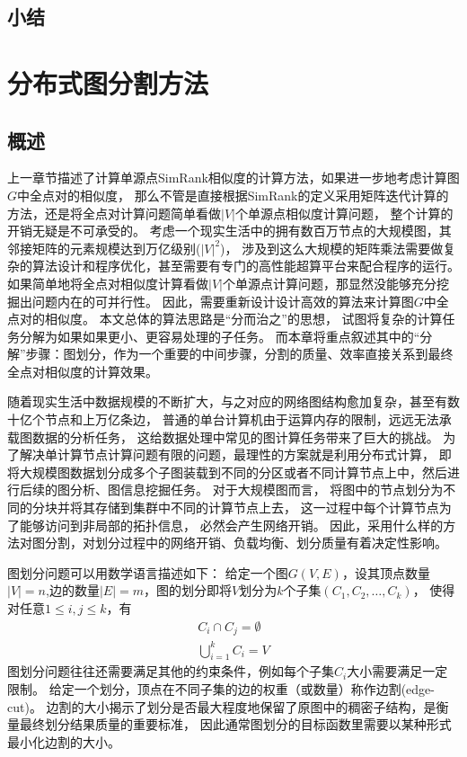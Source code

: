 \documentclass[master]{njuthesis}
\begin{document}
\section{小结}
\chapter{分布式图分割方法}\label{chapter_graphpartition}
\section{概述}
上一章节描述了计算单源点SimRank相似度的计算方法，如果进一步地考虑计算图$G$中全点对的相似度，
那么不管是直接根据SimRank的定义采用矩阵迭代计算的方法，还是将全点对计算问题简单看做$|V|$个单源点相似度计算问题，
整个计算的开销无疑是不可承受的。
考虑一个现实生活中的拥有数百万节点的大规模图，其邻接矩阵的元素规模达到万亿级别($|V|^2$)，
涉及到这么大规模的矩阵乘法需要做复杂的算法设计和程序优化，甚至需要有专门的高性能超算平台来配合程序的运行。
如果简单地将全点对相似度计算看做$|V|$个单源点计算问题，那显然没能够充分挖掘出问题内在的可并行性。
因此，需要重新设计设计高效的算法来计算图$G$中全点对的相似度。
本文总体的算法思路是“分而治之”的思想，
试图将复杂的计算任务分解为如果如果更小、更容易处理的子任务。
而本章将重点叙述其中的“分解”步骤：图划分，作为一个重要的中间步骤，分割的质量、效率直接关系到最终全点对相似度的计算效果。

随着现实生活中数据规模的不断扩大，与之对应的网络图结构愈加复杂，甚至有数十亿个节点和上万亿条边，
普通的单台计算机由于运算内存的限制，远远无法承载图数据的分析任务，
这给数据处理中常见的图计算任务带来了巨大的挑战。
为了解决单计算节点计算问题有限的问题，最理性的方案就是利用分布式计算，
即将大规模图数据划分成多个子图装载到不同的分区或者不同计算节点上中，然后进行后续的图分析、图信息挖掘任务。
对于大规模图而言， 将图中的节点划分为不同的分块并将其存储到集群中不同的计算节点上去，
这一过程中每个计算节点为了能够访问到非局部的拓扑信息， 必然会产生网络开销。
因此，采用什么样的方法对图分割，对划分过程中的网络开销、负载均衡、划分质量有着决定性影响。

图划分问题可以用数学语言描述如下：
给定一个图$G(V, E)$，设其顶点数量$|V|=n$,边的数量$|E|=m$，图的划分即将$V$划分为$k$个子集$(C_1, C_2, \dots, C_k)$，
使得对任意$1 \leq i,j \leq k$，有
\begin{equation}
\begin{aligned}
\label{eq:4-1}
 C_i \cap C_j=\emptyset \\
 \bigcup\limits_{i=1}^{k} C_{i} = V
 \end{aligned}
\end{equation}
图划分问题往往还需要满足其他的约束条件，例如每个子集$C_i$大小需要满足一定限制。
给定一个划分，顶点在不同子集的边的权重（或数量）称作边割(edge-cut)。
边割的大小揭示了划分是否最大程度地保留了原图中的稠密子结构，是衡量最终划分结果质量的重要标准，
因此通常图划分的目标函数里需要以某种形式最小化边割的大小。
\end{document}
